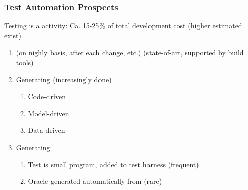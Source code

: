 \subsubsection*{Test Automation Prospects}
\begin{defBox}
    Testing is a  activity: Ca. 15-25\% of total development cost (higher estimated exist)
\end{defBox}
\begin{defBox}[title=Which Aspects of Testing can be \fatsf{Automated}?]
    \begin{enumerate}
        \item {} (on nighly basis, after each change, etc.) (state-of-art, supported by build tools)
        \item Generating  (increasingly done)
        \begin{enumerate}
            \item Code-driven
            \item Model-driven
            \item Data-driven
        \end{enumerate}
        \item Generating 
        \begin{enumerate}
            \item Test  is small program, added to test harness (frequent)
            \item Oracle generated automatically from  (rare)
        \end{enumerate}
    \end{enumerate}
\end{defBox}
